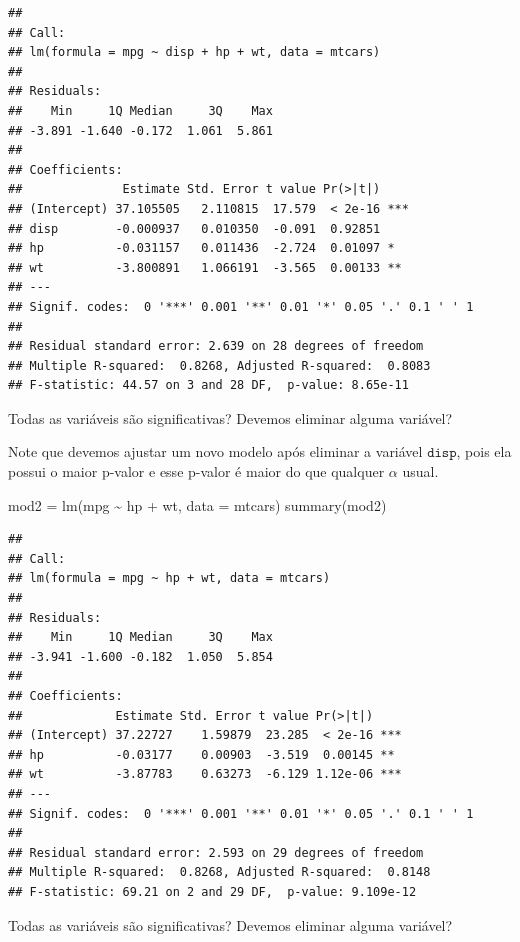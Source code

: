 \documentclass[
]{book}
\newenvironment{Shaded}{\begin{snugshade}}{\end{snugshade}}
\newcommand{\AttributeTok}[1]{\textcolor[rgb]{0.77,0.63,0.00}{#1}}
\newcommand{\FunctionTok}[1]{\textcolor[rgb]{0.00,0.00,0.00}{#1}}
\newcommand{\NormalTok}[1]{#1}
\newcommand{\OtherTok}[1]{\textcolor[rgb]{0.56,0.35,0.01}{#1}}
\newcommand{\SpecialCharTok}[1]{\textcolor[rgb]{0.00,0.00,0.00}{#1}}
\begin{document}
\begin{verbatim}
## 
## Call:
## lm(formula = mpg ~ disp + hp + wt, data = mtcars)
## 
## Residuals:
##    Min     1Q Median     3Q    Max 
## -3.891 -1.640 -0.172  1.061  5.861 
## 
## Coefficients:
##              Estimate Std. Error t value Pr(>|t|)    
## (Intercept) 37.105505   2.110815  17.579  < 2e-16 ***
## disp        -0.000937   0.010350  -0.091  0.92851    
## hp          -0.031157   0.011436  -2.724  0.01097 *  
## wt          -3.800891   1.066191  -3.565  0.00133 ** 
## ---
## Signif. codes:  0 '***' 0.001 '**' 0.01 '*' 0.05 '.' 0.1 ' ' 1
## 
## Residual standard error: 2.639 on 28 degrees of freedom
## Multiple R-squared:  0.8268, Adjusted R-squared:  0.8083 
## F-statistic: 44.57 on 3 and 28 DF,  p-value: 8.65e-11
\end{verbatim}

Todas as variáveis são significativas? Devemos eliminar alguma variável?

Note que devemos ajustar um novo modelo após eliminar a variável \(\texttt{disp}\), pois ela possui o maior p-valor e esse p-valor é maior do que qualquer \(\alpha\) usual.

\begin{Shaded}
\begin{Highlighting}[]
\NormalTok{mod2 }\OtherTok{=} \FunctionTok{lm}\NormalTok{(mpg }\SpecialCharTok{\textasciitilde{}}\NormalTok{ hp }\SpecialCharTok{+}\NormalTok{ wt, }\AttributeTok{data =}\NormalTok{ mtcars)}
\FunctionTok{summary}\NormalTok{(mod2)}
\end{Highlighting}
\end{Shaded}

\begin{verbatim}
## 
## Call:
## lm(formula = mpg ~ hp + wt, data = mtcars)
## 
## Residuals:
##    Min     1Q Median     3Q    Max 
## -3.941 -1.600 -0.182  1.050  5.854 
## 
## Coefficients:
##             Estimate Std. Error t value Pr(>|t|)    
## (Intercept) 37.22727    1.59879  23.285  < 2e-16 ***
## hp          -0.03177    0.00903  -3.519  0.00145 ** 
## wt          -3.87783    0.63273  -6.129 1.12e-06 ***
## ---
## Signif. codes:  0 '***' 0.001 '**' 0.01 '*' 0.05 '.' 0.1 ' ' 1
## 
## Residual standard error: 2.593 on 29 degrees of freedom
## Multiple R-squared:  0.8268, Adjusted R-squared:  0.8148 
## F-statistic: 69.21 on 2 and 29 DF,  p-value: 9.109e-12
\end{verbatim}

Todas as variáveis são significativas? Devemos eliminar alguma variável?
\end{document}
